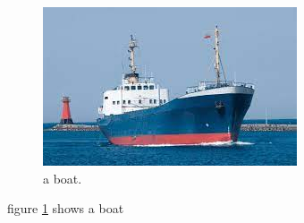 \documentclass{article}
\begin{document}
\begin{figure}
	\includegraphics[width=\linewidth]{boat.jpg}
	\caption{a boat.}
	\label{fig:boat1}
\end{figure}
figure \ref{fig:boat1} shows a boat
\end{document}
